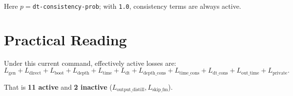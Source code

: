 \documentclass[11pt]{article}
\begin{document}
Here \(p=\)\texttt{dt-consistency-prob}; with \texttt{1.0}, consistency terms are always active.

\section{Practical Reading}

Under this current command, effectively active losses are:
\[
L_{\text{gen}} + L_{\text{direct}} + L_{\text{boot}} +
L_{\text{depth}} + L_{\text{time}} + L_{\text{dt}} +
L_{\text{depth\_cons}} + L_{\text{time\_cons}} + L_{\text{dt\_cons}} +
L_{\text{out\_time}} + L_{\text{private}}.
\]

That is \textbf{11 active} and \textbf{2 inactive} (\(L_{\text{output\_distill}},L_{\text{skip\_fm}}\)).
\end{document}
